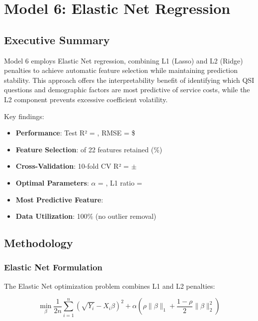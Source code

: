 \chapter{Model 6: Elastic Net Regression}\label{ch:model6}



\section{Executive Summary}

Model 6 employs Elastic Net regression, combining L1 (Lasso) and L2 (Ridge) penalties to achieve automatic feature selection while maintaining prediction stability. This approach offers the interpretability benefit of identifying which QSI questions and demographic factors are most predictive of service costs, while the L2 component prevents excessive coefficient volatility.

Key findings:
\begin{itemize}
    \item \textbf{Performance}: Test R² = \ModelSixRSquaredTest{}, RMSE = \$\ModelSixRMSETest{}
    \item \textbf{Feature Selection}: \ModelSixFeaturesSelected{} of 22 features retained (\ModelSixSparsityPercent{}\%)
    \item \textbf{Cross-Validation}: 10-fold CV R² = \ModelSixCVMean{} $\pm$ \ModelSixCVStd{}
    \item \textbf{Optimal Parameters}: $\alpha$ = \ModelSixAlpha{}, L1 ratio = \ModelSixLOneRatio{}
    \item \textbf{Most Predictive Feature}: \ModelSixMostImportant{}
    \item \textbf{Data Utilization}: 100\% (no outlier removal)
\end{itemize}

\section{Methodology}

\subsection{Elastic Net Formulation}

The Elastic Net optimization problem combines L1 and L2 penalties:

\begin{equation}
\min_{\beta} \frac{1}{2n} \sum_{i=1}^n \left(\sqrt{Y_i} - X_i\beta\right)^2 + \alpha \left(\rho \|\beta\|_1 + \frac{1-\rho}{2} \|\beta\|_2^2\right)
\end{equation}

